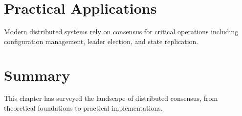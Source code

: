 \documentclass[
    language=english,
    doctype=book-chapter,
    institution=none,
]{../../omnilatex}
\begin{document}
\section{Practical Applications}
Modern distributed systems rely on consensus for critical operations
including configuration management, leader election, and state
replication.

\section{Summary}
This chapter has surveyed the landscape of distributed consensus,
from theoretical foundations to practical implementations.

\printbibliography
\end{document}
